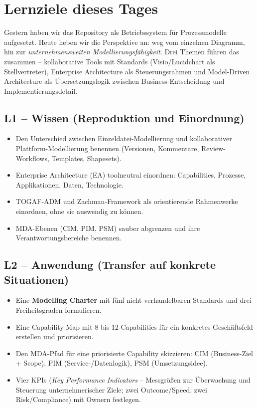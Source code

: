 \documentclass[11pt,a4paper,oneside]{article}
\newcommand{\fachbegriff}[1]{\textbf{#1}}
\begin{document}
\section*{Lernziele dieses Tages}
\thispagestyle{plain}

\noindent Gestern haben wir das Repository als Betriebssystem für Prozessmodelle aufgesetzt. Heute heben wir die Perspektive an: weg vom einzelnen Diagramm, hin zur \emph{unternehmensweiten Modellierungsfähigkeit}. Drei Themen führen das zusammen -- kollaborative Tools mit Standards (Visio/Lucidchart als Stellvertreter), Enterprise Architecture als Steuerungsrahmen und Model-Driven Architecture als Übersetzungslogik zwischen Business-Entscheidung und Implementierungsdetail.

\subsection*{L1 -- Wissen (Reproduktion und Einordnung)}
\begin{itemize}
  \item Den Unterschied zwischen Einzeldatei-Modellierung und kollaborativer Plattform-Modellierung benennen (Versionen, Kommentare, Review-Workflows, Templates, Shapesets).
  \item Enterprise Architecture (EA) toolneutral einordnen: Capabilities, Prozesse, Applikationen, Daten, Technologie.
  \item TOGAF-ADM und Zachman-Framework als orientierende Rahmenwerke einordnen, ohne sie auswendig zu können.
  \item MDA-Ebenen (CIM, PIM, PSM) sauber abgrenzen und ihre Verantwortungsbereiche benennen.
\end{itemize}

\subsection*{L2 -- Anwendung (Transfer auf konkrete Situationen)}
\begin{itemize}
  \item Eine \fachbegriff{Modelling Charter} mit fünf nicht verhandelbaren Standards und drei Freiheitsgraden formulieren.
  \item Eine Capability Map mit 8 bis 12 Capabilities für ein konkretes Geschäftsfeld erstellen und priorisieren.
  \item Den MDA-Pfad für eine priorisierte Capability skizzieren: CIM (Business-Ziel + Scope), PIM (Service-/Datenlogik), PSM (Umsetzungsidee).
  \item Vier KPIs (\emph{Key Performance Indicators} -- Messgrößen zur Überwachung und Steuerung unternehmerischer Ziele; zwei Outcome/Speed, zwei Risk/Compliance) mit Ownern festlegen.
\end{itemize}
\end{document}
